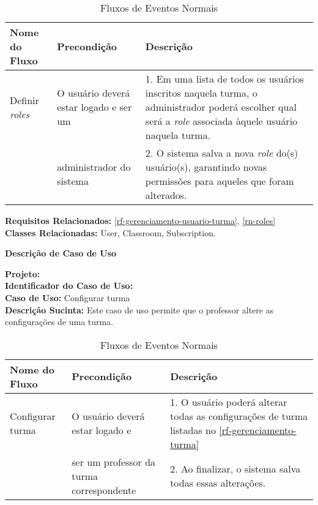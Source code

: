\begin{table}[H]
	\centering \vspace{0.5cm} \footnotesize
	\caption{Fluxos de Eventos Normais}
	\begin{tabular}{|p{2.3cm}|p{2.5cm}|p{10cm}|} \hline  \rowcolor[rgb]{0.8,0.8,0.8}
		
		Nome do Fluxo & Precondição & Descrição  \\ \hline		
		
		Definir \textit{roles} & O usuário  deverá estar logado e ser um & 1. Em uma lista de todos os usuários inscritos naquela turma, o administrador poderá escolher qual será a \textit{role} associada àquele usuário naquela turma.  \\
		{} &  administrador do sistema  & 2.  O sistema salva a nova \textit{role} do(s) usuário(s), garantindo novas permissões para aqueles que foram alterados.\\ \hline
		
		
	\end{tabular}
\end{table}


\noindent  \textbf{Requisitos Relacionados:} \ref{rf-gerenciamento-usuario-turma}, \ref{rn-roles}       \\ \textbf{Classes Relacionadas:} User, Classroom, Subscription.

\newpage
\clearpage
\begin{flushright}    \textbf{Descrição de Caso de Uso}   \end{flushright}         
\noindent \textbf{Projeto:} \imprimirtitulo  \\
\textbf{Identificador do Caso de Uso:} \UC\label{uc-configurar-turma} \\
\textbf{Caso de Uso:} Configurar turma \\
\noindent \textbf{Descrição Sucinta:} Este caso de uso permite que o professor altere as configurações de uma turma.\\

\begin{table}[H]
	\centering \vspace{0.5cm} \footnotesize
	\caption{Fluxos de Eventos Normais}
	\begin{tabular}{|p{2.3cm}|p{2.5cm}|p{10cm}|} \hline  \rowcolor[rgb]{0.8,0.8,0.8}
		
		Nome do Fluxo & Precondição & Descrição  \\ \hline		
		
		Configurar turma & O usuário  deverá estar logado e& 1. O usuário poderá alterar todas as configurações de turma listadas no \ref{rf-gerenciamento-turma}  \\
		{} & ser um professor da turma correspondente & 2.  Ao finalizar, o sistema salva todas essas alterações.\\ \hline
	\end{tabular}
\end{table}


